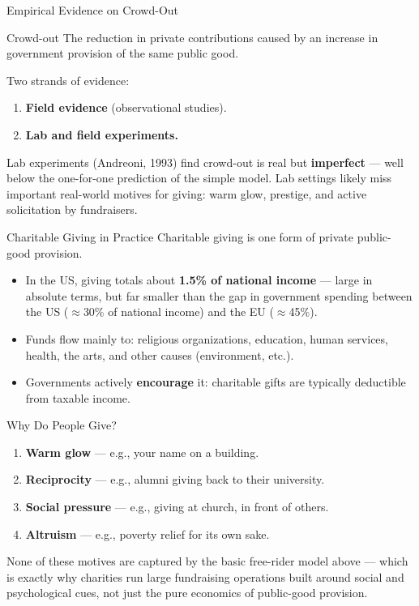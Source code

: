 \documentclass[11pt,aspectratio=169]{beamer}
\begin{document}
\begin{frame}{Empirical Evidence on Crowd-Out}
  \begin{block}{Crowd-out}
    The reduction in private contributions caused by an increase in government provision of the same public good.
  \end{block}
  Two strands of evidence:
  \begin{enumerate}
    \item \textbf{Field evidence} (observational studies).
    \item \textbf{Lab and field experiments.}
  \end{enumerate}
  \vspace{0.4em}
  \small Lab experiments (Andreoni, 1993) find crowd-out is real but \textbf{imperfect} --- well below the one-for-one prediction of the simple model. Lab settings likely miss important real-world motives for giving: warm glow, prestige, and active solicitation by fundraisers.
\end{frame}

\begin{frame}{Charitable Giving in Practice}
  Charitable giving is one form of private public-good provision.
  \begin{itemize}
    \item In the US, giving totals about \textbf{1.5\% of national income} --- large in absolute terms, but far smaller than the gap in government spending between the US ($\approx$30\% of national income) and the EU ($\approx$45\%).
    \item Funds flow mainly to: religious organizations, education, human services, health, the arts, and other causes (environment, etc.).
    \item Governments actively \textbf{encourage} it: charitable gifts are typically deductible from taxable income.
  \end{itemize}
\end{frame}

\begin{frame}{Why Do People Give?}
  \begin{enumerate}
    \item \textbf{Warm glow} --- e.g., your name on a building.
    \item \textbf{Reciprocity} --- e.g., alumni giving back to their university.
    \item \textbf{Social pressure} --- e.g., giving at church, in front of others.
    \item \textbf{Altruism} --- e.g., poverty relief for its own sake.
  \end{enumerate}
  \vspace{0.5em}
  \small None of these motives are captured by the basic free-rider model above --- which is exactly why charities run large fundraising operations built around social and psychological cues, not just the pure economics of public-good provision.
\end{frame}
\end{document}
